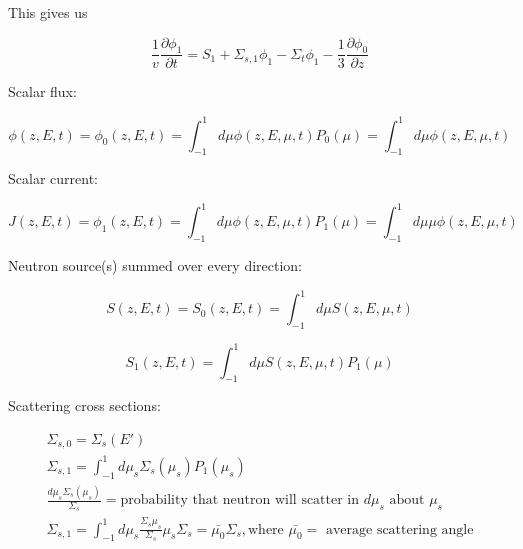 \documentclass[12pt]{article}
\newcommand{\sigso}{\ensuremath{\Sigma_{s,0}}}
\newcommand{\sigsi}{\ensuremath{\Sigma_{s,1}}}
\begin{document}
This gives us

\begin{equation*}
\frac{1}{v}\frac{\partial\phi_1}{\partial t} = S_1 + \sigsi\phi_1 - \Sigma_t\phi_1 - 
\frac{1}{3}\frac{\partial\phi_0}{\partial z}
\end{equation*}

Scalar flux:

\begin{equation*}
\phi(z,E,t) = \phi_0(z,E,t) = \int_{-1}^{1}d\mu\phi(z,E,\mu,t)P_0(\mu) = \int_{-1}^{1}d\mu\phi(z,E,\mu,t)
\end{equation*}

Scalar current:

\begin{equation*}
J(z,E,t) = \phi_1(z,E,t) = \int_{-1}^{1}d\mu\phi(z,E,\mu,t)P_1(\mu) = \int_{-1}^{1}d\mu\mu\phi(z,E,\mu,t)
\end{equation*}

Neutron source(s) summed over every direction:

\begin{equation*}
S(z,E,t) = S_0(z,E,t) = \int_{-1}^{1}d\mu S(z,E,\mu,t)
\end{equation*}

\begin{equation*}
S_1(z,E,t) = \int_{-1}^1d\mu S(z,E,\mu,t)P_1(\mu)
\end{equation*}

Scattering cross sections:

\begin{gather*}
\sigso = \Sigma_s(E') \\
\sigsi = \int_{-1}^1d\mu_s\Sigma_s(\mu_s)P_1(\mu_s) \\
\frac{d\mu_s\Sigma_s(\mu_s)}{\Sigma_s} = \text{probability that neutron will scatter in $d\mu_s$ about $\mu_s$} \\
\sigsi = \int_{-1}^1d\mu_s\frac{\Sigma_s\mu_s}{\Sigma_s}\mu_s\Sigma_s = \bar{\mu_0}\Sigma_s, 
\text{where $\bar{\mu_0} =$ average scattering angle}
\end{gather*}
\end{document}
